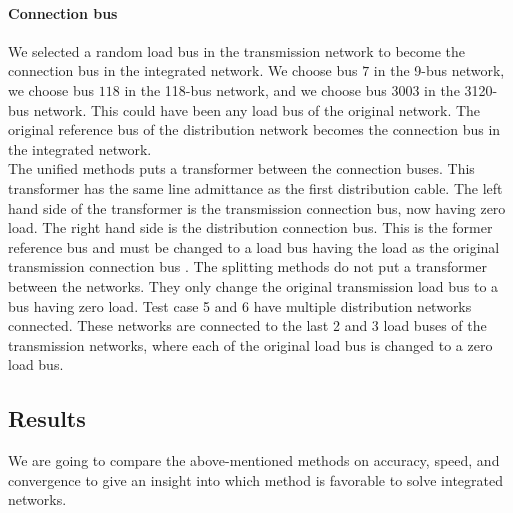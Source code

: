 \documentclass[10pt,journal]{article}
\begin{document}
\paragraph{Connection bus}
We selected a random load bus in the transmission network to become the connection bus in the integrated network. We choose bus $7$ in the 9-bus network, we choose bus $118$ in the 118-bus network, and we choose bus $3003$ in the 3120-bus network. This could have been any load bus of the original network. The original reference bus of the distribution network becomes the connection bus in the integrated network. \\
The unified methods puts a transformer between the connection buses. This transformer has the same line admittance as the first distribution cable. The left hand side of the transformer is the transmission connection bus, now having zero load. The right hand side is the distribution connection bus. This is the former reference bus and must be changed to a load bus having the load as the original transmission connection bus \cite{Taranto2008}. The splitting methods do not put a transformer between the networks. They only change the original transmission load bus to a bus having zero load.   \newline \newline
Test case 5 and 6 have multiple distribution networks connected. These networks are connected to the last 2 and 3 load buses of the transmission networks, where each of the original load bus is changed to a zero load bus. 
\subsection{Results}
We are going to compare the above-mentioned methods on accuracy, speed, and convergence to give an insight into which method is favorable to solve integrated networks. 
\end{document}
